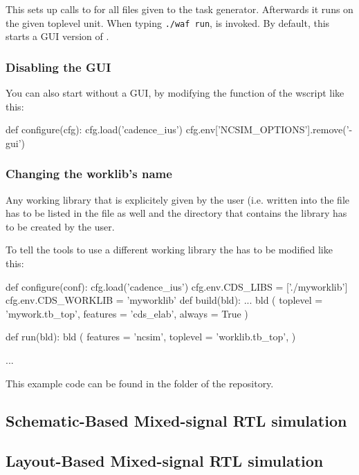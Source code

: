 This  sets up calls to  for all files given to the
 task generator. Afterwards it runs  on the given
toplevel unit. When typing \lstinline[style=BashInputStyle]'./waf run',
 is invoked. By default, this starts a GUI version of .
\subsubsection{Disabling the  GUI}
You can also start  without a GUI, by modifying the 
function of the wscript like this:
\begin{lstwscript}
def configure(cfg):
    cfg.load('cadence_ius')
    cfg.env['NCSIM_OPTIONS'].remove('-gui')
\end{lstwscript}

\subsubsection{Changing the worklib's name}
Any working library that is explicitely given by the user (i.e. written into
the  file has to be listed in the  file as well and the
directory that contains the library has to be created by the user.

To tell the  tools to use a different working library the
 has to be modified like this:
\begin{lstwscript}
def configure(conf):
    cfg.load('cadence_ius')
    cfg.env.CDS_LIBS = ['./myworklib']
    cfg.env.CDS_WORKLIB = 'myworklib'
def build(bld):
    ...
    bld (
        toplevel = 'mywork.tb_top',
        features = 'cds_elab',
        always = True
    )

def run(bld):
    bld (
        features = 'ncsim',
        toplevel = 'worklib.tb_top',
    )

...
\end{lstwscript}
This example code can be found in the folder
 of the repository.

\subsection{Schematic-Based Mixed-signal RTL simulation}

\subsection{Layout-Based Mixed-signal RTL simulation}

